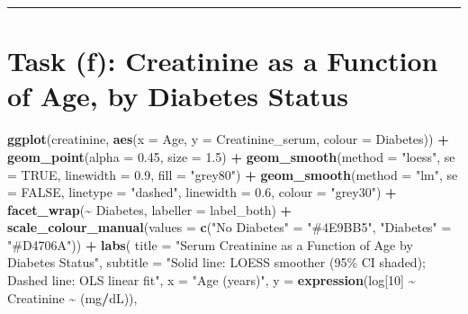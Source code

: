 \documentclass[
  12pt,
]{article}
\newenvironment{Shaded}{\begin{snugshade}}{\end{snugshade}}
\newcommand{\AttributeTok}[1]{\textcolor[rgb]{0.13,0.29,0.53}{#1}}
\newcommand{\ConstantTok}[1]{\textcolor[rgb]{0.56,0.35,0.01}{#1}}
\newcommand{\DecValTok}[1]{\textcolor[rgb]{0.00,0.00,0.81}{#1}}
\newcommand{\FloatTok}[1]{\textcolor[rgb]{0.00,0.00,0.81}{#1}}
\newcommand{\FunctionTok}[1]{\textcolor[rgb]{0.13,0.29,0.53}{\textbf{#1}}}
\newcommand{\NormalTok}[1]{#1}
\newcommand{\OtherTok}[1]{\textcolor[rgb]{0.56,0.35,0.01}{#1}}
\newcommand{\SpecialCharTok}[1]{\textcolor[rgb]{0.81,0.36,0.00}{\textbf{#1}}}
\newcommand{\StringTok}[1]{\textcolor[rgb]{0.31,0.60,0.02}{#1}}
\begin{document}
\begin{center}\rule{0.5\linewidth}{0.5pt}\end{center}

\hypertarget{task-f-creatinine-as-a-function-of-age-by-diabetes-status}{%
\section{Task (f): Creatinine as a Function of Age, by Diabetes
Status}\label{task-f-creatinine-as-a-function-of-age-by-diabetes-status}}

\begin{Shaded}
\begin{Highlighting}[]
\FunctionTok{ggplot}\NormalTok{(creatinine, }\FunctionTok{aes}\NormalTok{(}\AttributeTok{x =}\NormalTok{ Age, }\AttributeTok{y =}\NormalTok{ Creatinine\_serum, }\AttributeTok{colour =}\NormalTok{ Diabetes)) }\SpecialCharTok{+}
  \FunctionTok{geom\_point}\NormalTok{(}\AttributeTok{alpha =} \FloatTok{0.45}\NormalTok{, }\AttributeTok{size =} \FloatTok{1.5}\NormalTok{) }\SpecialCharTok{+}
  \FunctionTok{geom\_smooth}\NormalTok{(}\AttributeTok{method =} \StringTok{"loess"}\NormalTok{, }\AttributeTok{se =} \ConstantTok{TRUE}\NormalTok{, }\AttributeTok{linewidth =} \FloatTok{0.9}\NormalTok{, }\AttributeTok{fill =} \StringTok{"grey80"}\NormalTok{) }\SpecialCharTok{+}
  \FunctionTok{geom\_smooth}\NormalTok{(}\AttributeTok{method =} \StringTok{"lm"}\NormalTok{,   }\AttributeTok{se =} \ConstantTok{FALSE}\NormalTok{, }\AttributeTok{linetype =} \StringTok{"dashed"}\NormalTok{,}
              \AttributeTok{linewidth =} \FloatTok{0.6}\NormalTok{, }\AttributeTok{colour =} \StringTok{"grey30"}\NormalTok{) }\SpecialCharTok{+}
  \FunctionTok{facet\_wrap}\NormalTok{(}\SpecialCharTok{\textasciitilde{}}\NormalTok{ Diabetes, }\AttributeTok{labeller =}\NormalTok{ label\_both) }\SpecialCharTok{+}
  \FunctionTok{scale\_colour\_manual}\NormalTok{(}\AttributeTok{values =} \FunctionTok{c}\NormalTok{(}\StringTok{"No Diabetes"} \OtherTok{=} \StringTok{"\#4E9BB5"}\NormalTok{, }\StringTok{"Diabetes"} \OtherTok{=} \StringTok{"\#D4706A"}\NormalTok{)) }\SpecialCharTok{+}
  \FunctionTok{labs}\NormalTok{(}
    \AttributeTok{title    =} \StringTok{"Serum Creatinine as a Function of Age by Diabetes Status"}\NormalTok{,}
    \AttributeTok{subtitle =} \StringTok{"Solid line: LOESS smoother (95\% CI shaded); Dashed line: OLS linear fit"}\NormalTok{,}
    \AttributeTok{x        =} \StringTok{"Age (years)"}\NormalTok{,}
    \AttributeTok{y        =} \FunctionTok{expression}\NormalTok{(log[}\DecValTok{10}\NormalTok{] }\SpecialCharTok{\textasciitilde{}}\NormalTok{ Creatinine }\SpecialCharTok{\textasciitilde{}}\NormalTok{ (mg}\SpecialCharTok{/}\NormalTok{dL)),}

\end{Highlighting}
\end{Shaded}
\end{document}
